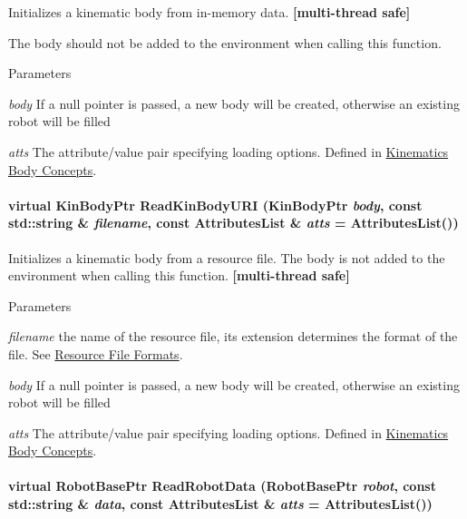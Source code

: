 Initializes a kinematic body from in-\/memory data. {\bfseries \mbox{[}multi-\/thread safe\mbox{]}} 

The body should not be added to the environment when calling this function. 
\begin{DoxyParams}{Parameters}
\item[{\em body}]If a null pointer is passed, a new body will be created, otherwise an existing robot will be filled \item[{\em atts}]The attribute/value pair specifying loading options. Defined in \hyperlink{arch__kinbody}{Kinematics Body Concepts}. \end{DoxyParams}
\hypertarget{classOpenRAVE_1_1EnvironmentBase_ab9fda0698f28bd76aefcad4f5ec4340a}{
\paragraph[{ReadKinBodyURI}]{\setlength{\rightskip}{0pt plus 5cm}virtual KinBodyPtr ReadKinBodyURI (KinBodyPtr {\em body}, \/  const std::string \& {\em filename}, \/  const AttributesList \& {\em atts} = {\ttfamily AttributesList()})}\hfill}
\label{classOpenRAVE_1_1EnvironmentBase_ab9fda0698f28bd76aefcad4f5ec4340a}


Initializes a kinematic body from a resource file. The body is not added to the environment when calling this function. {\bfseries \mbox{[}multi-\/thread safe\mbox{]}} 


\begin{DoxyParams}{Parameters}
\item[{\em filename}]the name of the resource file, its extension determines the format of the file. See \hyperlink{architecture__concepts_supported_formats}{Resource File Formats}. \item[{\em body}]If a null pointer is passed, a new body will be created, otherwise an existing robot will be filled \item[{\em atts}]The attribute/value pair specifying loading options. Defined in \hyperlink{arch__kinbody}{Kinematics Body Concepts}. \end{DoxyParams}
\hypertarget{classOpenRAVE_1_1EnvironmentBase_a70931fb3eb67326208afdc830304a0b6}{
\paragraph[{ReadRobotData}]{\setlength{\rightskip}{0pt plus 5cm}virtual RobotBasePtr ReadRobotData (RobotBasePtr {\em robot}, \/  const std::string \& {\em data}, \/  const AttributesList \& {\em atts} = {\ttfamily AttributesList()})}\hfill}
\label{classOpenRAVE_1_1EnvironmentBase_a70931fb3eb67326208afdc830304a0b6}


